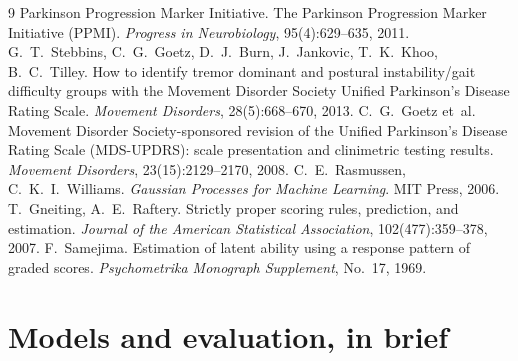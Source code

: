 \documentclass[11pt,a4paper]{article}
\begin{document}
\begin{thebibliography}{9}
 Parkinson Progression Marker Initiative.
  The Parkinson Progression Marker Initiative (PPMI).
  \emph{Progress in Neurobiology}, 95(4):629--635, 2011.
 G.~T.~Stebbins, C.~G.~Goetz, D.~J.~Burn, J.~Jankovic,
  T.~K.~Khoo, B.~C.~Tilley.
  How to identify tremor dominant and postural instability/gait difficulty
  groups with the Movement Disorder Society Unified Parkinson's Disease Rating
  Scale. \emph{Movement Disorders}, 28(5):668--670, 2013.
 C.~G.~Goetz et~al.
  Movement Disorder Society-sponsored revision of the Unified Parkinson's
  Disease Rating Scale (MDS-UPDRS): scale presentation and clinimetric testing
  results. \emph{Movement Disorders}, 23(15):2129--2170, 2008.
 C.~E.~Rasmussen, C.~K.~I.~Williams.
  \emph{Gaussian Processes for Machine Learning}. MIT Press, 2006.
 T.~Gneiting, A.~E.~Raftery.
  Strictly proper scoring rules, prediction, and estimation.
  \emph{Journal of the American Statistical Association}, 102(477):359--378, 2007.
 F.~Samejima.
  Estimation of latent ability using a response pattern of graded scores.
  \emph{Psychometrika Monograph Supplement}, No.~17, 1969.
\end{thebibliography}

\appendix
\section{Models and evaluation, in brief}
\end{document}
